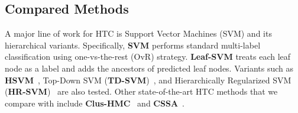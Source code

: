 \documentclass[11pt,a4paper]{article}
\newcommand{\start}[1]{\vspace{1.8mm}\noindent{{\bf #1}}}
\begin{document}
\begin{table}[t]
    \caption{\textbf{Performance comparison on RCV1.} * denotes the results reported in~\citet{peng2018large} on the same dataset split. Note that the results of HR-SVM reported in~\citet{gopal2013recursive} are not comparable as they use a different hierarchy with 137 labels. } 
    \vspace{-.1cm}
    \label{table_rcv1}
    \centering
\vspace*{-.1cm}
\end{table}

\subsection{Compared Methods}
\start{1. Traditional HTC Methods.}
A major line of work for HTC is Support Vector Machines (SVM) and its hierarchical variants.
Specifically, \textbf{SVM} performs standard multi-label classification using one-vs-the-rest (OvR) strategy.
\textbf{Leaf-SVM} treats each leaf node as a label and adds the ancestors of predicted leaf nodes. 
Variants such as \textbf{HSVM}~\citep{tsochantaridis2005large}, Top-Down SVM (\textbf{TD-SVM})~\citep{liu2005support}, and Hierarchically Regularized SVM (\textbf{HR-SVM})~\citep{gopal2013recursive} are also tested.
Other state-of-the-art HTC methods that we compare with include \textbf{Clus-HMC}~\cite{vens2008decision} and \textbf{CSSA}~\cite{bi2011multi}.
\end{document}

